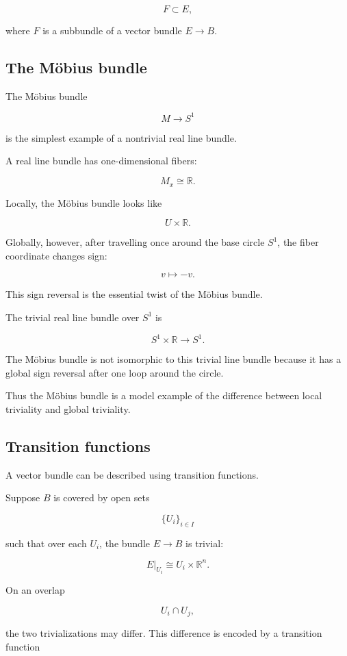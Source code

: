 \documentclass[12pt,a4paper]{article}
\newcommand{\R}{\mathbb{R}}
\theoremstyle{notespace}
\begin{document}
	\[
	F\subset E,
	\]
	
	where \(F\) is a subbundle of a vector bundle \(E\to B\).
	
	\subsection{The M\"obius bundle}
	
	The M\"obius bundle
	
	\[
	M\to S^{1}
	\]
	
	is the simplest example of a nontrivial real line bundle.
	
	A real line bundle has one-dimensional fibers:
	
	\[
	M_x\cong \R.
	\]
	
	Locally, the M\"obius bundle looks like
	
	\[
	U\times \R.
	\]
	
	Globally, however, after travelling once around the base circle \(S^{1}\), the fiber coordinate changes sign:
	
	\[
	v\mapsto -v.
	\]
	
	This sign reversal is the essential twist of the M\"obius bundle.
	
	The trivial real line bundle over \(S^{1}\) is
	
	\[
	S^{1}\times \R\to S^{1}.
	\]
	
	The M\"obius bundle is not isomorphic to this trivial line bundle because it has a global sign reversal after one loop around the circle.
	
	Thus the M\"obius bundle is a model example of the difference between local triviality and global triviality.
	
	\subsection{Transition functions}
	
	A vector bundle can be described using transition functions.
	
	Suppose \(B\) is covered by open sets
	
	\[
	\{U_i\}_{i\in I}
	\]
	
	such that over each \(U_i\), the bundle \(E\to B\) is trivial:
	
	\[
	E|_{U_i}\cong U_i\times \R^{n}.
	\]
	
	On an overlap
	
	\[
	U_i\cap U_j,
	\]
	
	the two trivializations may differ. This difference is encoded by a transition function
	
\end{document}
